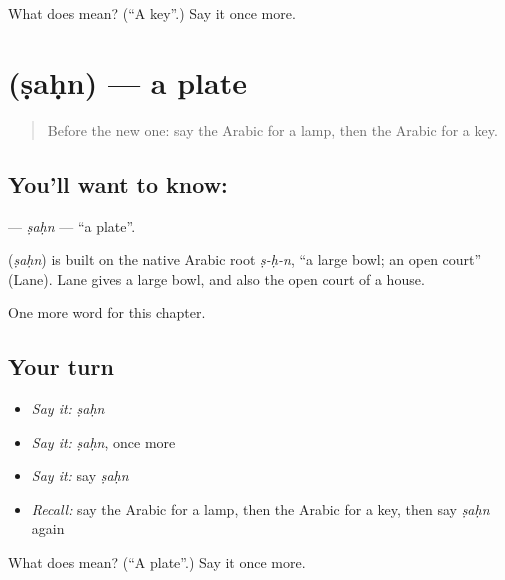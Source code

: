 \begin{tcolorbox}[breakable,colback=teal!4,colframe=teal!35!black,title={Before you move on}]
What does  mean? (\textquotedblleft{}A key\textquotedblright{}.) Say it once more.
\end{tcolorbox}
\section[\texorpdfstring{\ar{صحن} (ṣaḥn)}{صحن (ṣaḥn)}]{ (ṣaḥn) — a plate}

\label{lesson:AR-C71-sahn}



\begin{quote}
Before the new one: say the Arabic for a lamp, then the Arabic for a key.
\end{quote}

\subsection*{You'll want to know: }
\textbf{} — \emph{ṣaḥn} — \textquotedblleft{}a plate\textquotedblright{}.

\begin{cousinweb}
\textbf{} (\emph{ṣaḥn}) is built on the native Arabic root \emph{ṣ-ḥ-n}, \textquotedblleft{}a large bowl; an open court\textquotedblright{} (Lane). Lane gives a large bowl, and also the open court of a house.
\end{cousinweb}

\begin{grammarlens}[title={What you've built}]
One more word for this chapter.
\end{grammarlens}

\subsection*{Your turn}
\begin{itemize}
\raggedright
  \item \emph{Say it:} \emph{ṣaḥn}
  \item \emph{Say it:} \emph{ṣaḥn}, once more
  \item \emph{Say it:} say \emph{ṣaḥn}
  \item \emph{Recall:} say the Arabic for a lamp, then the Arabic for a key, then say \emph{ṣaḥn} again
\end{itemize}

\begin{tcolorbox}[breakable,colback=teal!4,colframe=teal!35!black,title={Before you move on}]
What does  mean? (\textquotedblleft{}A plate\textquotedblright{}.) Say it once more.
\end{tcolorbox}
